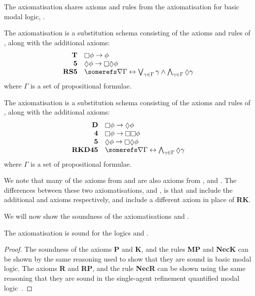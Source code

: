 The axiomatisation \axiomKiF{} shares axioms and rules from the axiomatisation
for basic modal logic, \axiomK{}. 

\begin{definition}
The axiomatisation \axiomSiF{} is a substitution schema consisting of the axioms
and rules of \axiomFi{}, along with the additional axioms:
$$
\begin{array}{rl}
{\bf T} & \knows \phi \implies \phi\\
{\bf 5} & \suspects \phi \implies \knows \suspects \phi\\
{\bf RS5} & \somerefs \covers \Gamma \iff \bigvee_{\gamma \in \Gamma} \gamma \land 
\bigwedge_{\gamma \in \Gamma} \suspects \gamma
\end{array}
$$
where $\Gamma$ is a set of propositional formulae.
\end{definition}

\begin{definition}
The axiomatisation \axiomKDiF{} is a substitution schema consisting of the axioms
and rules of \axiomFi{}, along with the additional axioms:
$$
\begin{array}{rl}
{\bf D} & \knows \phi \implies \suspects \phi\\
{\bf 4} & \knows \phi \implies \knows \knows \phi\\
{\bf 5} & \suspects \phi \implies \knows \suspects \phi\\
{\bf RKD45} & \somerefs \covers \Gamma \iff \bigwedge_{\gamma \in \Gamma} \suspects \gamma
\end{array}
$$
where $\Gamma$ is a set of propositional formulae.
\end{definition}

We note that many of the axioms from \axiomSiF{} and \axiomKDiF{} are also
axioms from \axiomS{}, \axiomKD{} and \axiomKiF{}. The differences between
these two axiomatisations, and \axiomKiF{}, is that \axiomSiF{} and \axiomKDiF{}
include the additional \axiomS{} and \axiomKD{} axioms respectively, and include
a different axiom in place of {\bf RK}.

We will now show the soundness of the axiomatisations \axiomSiF{} and
\axiomKDiF{}.

\begin{lemma}
The axiomatisation \axiomFi{} is sound for the logics \logicSiF{} and
\logicKDiF{}.
\end{lemma}

\begin{proof}
The soundness of the axioms {\bf P} and {\bf K}, and the rules {\bf MP} and {\bf
NecK} can be shown by the same reasoning used to show that they are sound in
basic modal logic. The axioms {\bf R} and {\bf RP}, and the rule {\bf NecR} can
be shown using the same reasoning that they are sound in the single-agent
refinement quantified modal logic~\cite{french2010future}.
\end{proof}

